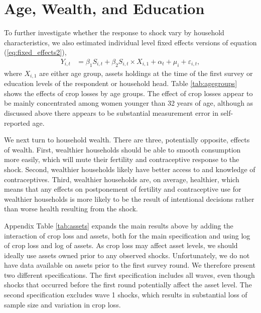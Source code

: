 \documentclass[letterpaper,12pt]{article}
\begin{document}















\clearpage
\section{Age, Wealth, and Education}

To further investigate whether the response to shock vary by household
characteristics, we also estimated individual level fixed effects versions 
of equation (\ref{eq:fixed_effects2}),
\begin{align}
Y_{i,t} &=  \beta_1 S_{i,t}  +  \beta_2 S_{i,t} \times X_{i,1} +
\alpha_{t} + \mu_i + \varepsilon_{i,t},   
\label{eq:fixed_effects2} 
\end{align}
where $X_{i,1}$ are either age group, assets holdings at the time of 
the first survey or education levels of the respondent or household head.
Table \ref{tab:agegroups} shows the effects of crop losses by age groups.
The effect of crop losses appear to be mainly concentrated among women 
younger than 32 years of age, although as discussed above there appears 
to be substantial measurement error in self-reported age.




We next turn to household wealth.
There are three, potentially opposite, effects of wealth.
First,
wealthier households should be able to smooth consumption more easily,
which will mute their fertility and contraceptive response to the shock.
Second, 
wealthier households likely have better access to and knowledge
of contraceptives.
Third, 
wealthier households are, on average, healthier, which means that any 
effects on postponement of fertility and contraceptive use for wealthier
households is more likely to be the result of intentional decisions 
rather than worse health resulting from the shock.

Appendix Table \ref{tab:assets} expands the main results above by adding 
the interaction of crop loss and assets, both for the main specification
and using log of crop loss and log of assets.
As crop loss may affect asset levels, we should ideally use assets owned 
prior to any observed shocks.
Unfortunately, we do not have data available on assets prior to the first 
survey round.
We therefore present two different specifications.
The first specification includes all waves, even though shocks that 
occurred before the first round potentially affect the asset level.
The second specification excludes wave 1 shocks, which results in
substantial loss of sample size and variation in crop loss.
\end{document}
